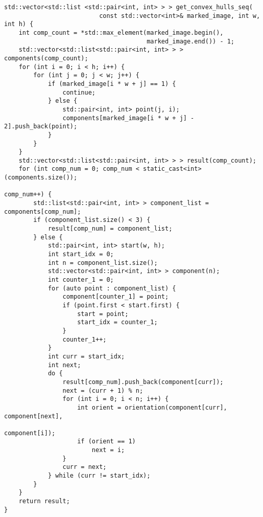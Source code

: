 \documentclass{report}
\begin{document}
\begin{lstlisting}
std::vector<std::list <std::pair<int, int> > > get_convex_hulls_seq(
                          const std::vector<int>& marked_image, int w, int h) {
    int comp_count = *std::max_element(marked_image.begin(),
                                       marked_image.end()) - 1;
    std::vector<std::list<std::pair<int, int> > > components(comp_count);
    for (int i = 0; i < h; i++) {
        for (int j = 0; j < w; j++) {
            if (marked_image[i * w + j] == 1) {
                continue;
            } else {
                std::pair<int, int> point(j, i);
                components[marked_image[i * w + j] - 2].push_back(point);
            }
        }
    }
    std::vector<std::list<std::pair<int, int> > > result(comp_count);
    for (int comp_num = 0; comp_num < static_cast<int>(components.size());
                                                                  comp_num++) {
        std::list<std::pair<int, int> > component_list = components[comp_num];
        if (component_list.size() < 3) {
            result[comp_num] = component_list;
        } else {
            std::pair<int, int> start(w, h);
            int start_idx = 0;
            int n = component_list.size();
            std::vector<std::pair<int, int> > component(n);
            int counter_1 = 0;
            for (auto point : component_list) {
                component[counter_1] = point;
                if (point.first < start.first) {
                    start = point;
                    start_idx = counter_1;
                }
                counter_1++;
            }
            int curr = start_idx;
            int next;
            do {
                result[comp_num].push_back(component[curr]);
                next = (curr + 1) % n;
                for (int i = 0; i < n; i++) {
                    int orient = orientation(component[curr], component[next],
                                                                 component[i]);
                    if (orient == 1)
                        next = i;
                }
                curr = next;
            } while (curr != start_idx);
        }
    }
    return result;
}
\end{lstlisting}
\end{document}
